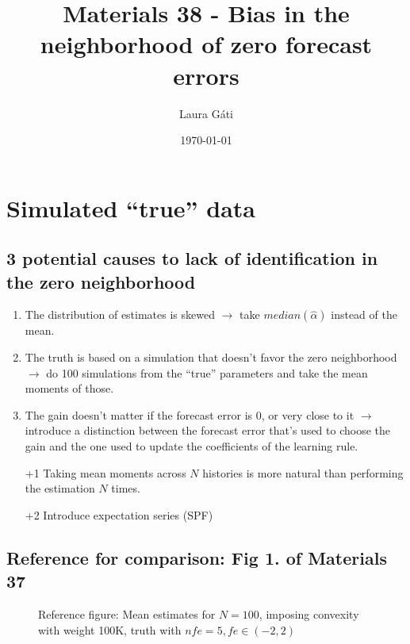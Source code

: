 \documentclass[11pt]{article}
\def \myFigPath {../../figures/}
\renewcommand{\[}{\begin{equation}}
\renewcommand{\]}{\end{equation}}
\def\mySmallerFigScale{0.18}
\def\myTinyFigScale{0.16}
\begin{document}
\linespread{1.0}

\title{Materials 38 - Bias in the neighborhood of zero forecast errors}
\author{Laura G\'ati} 
\date{\today}
\maketitle


\tableofcontents


\newpage

\section{Simulated ``true'' data}
\subsection*{3 potential causes to lack of identification in the zero neighborhood}
\begin{enumerate}
\item The distribution of estimates is skewed $\rightarrow$ take $median(\hat{\alpha})$ instead of the mean.
\item The truth is based on a simulation that doesn't favor the zero neighborhood $\rightarrow$ do 100 simulations from the ``true'' parameters and take the mean moments of those.
\item The gain doesn't matter if the forecast error is 0, or very close to it $\rightarrow$ introduce a distinction between the forecast error that's used to choose the gain and the one used to update the coefficients of the learning rule.
\item[+1] Taking mean moments across $N$ histories is more natural than performing the estimation $N$ times.
\item[+2] Introduce expectation series (SPF)
\end{enumerate}

\subsection*{Reference for comparison: Fig 1. of Materials 37}

\begin{figure}[h!]
\hfill
{}
\caption{Reference figure: Mean estimates for $N=100$, imposing convexity with weight 100K, truth with $nfe=5, fe \in(-2,2)$}
\end{figure}
\end{document}
